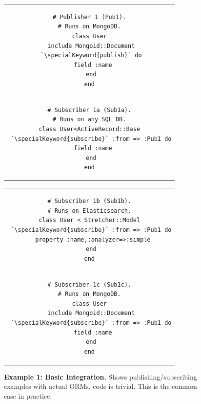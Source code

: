 \begin{figure}[t]
\begin{tabular}{c}
\begin{minipage}{.22\textwidth}
\begin{lstlisting}[xleftmargin=1pt,framexleftmargin=1pt]
# Publisher 1 (Pub1).
# Runs on MongoDB.
class User
 include Mongoid::Document
 `\specialKeyword{publish}` do
  field :name
 end
end
\end{lstlisting}
\end{minipage}\vspace{-8pt}\\
\begin{minipage}{.22\textwidth}
\begin{lstlisting}[xleftmargin=1pt,framexleftmargin=1pt]
# Subscriber 1a (Sub1a).
# Runs on any SQL DB.
class User<ActiveRecord::Base
 `\specialKeyword{subscribe}` :from => :Pub1 do
  field :name
 end
end
\end{lstlisting}
\end{minipage}
\end{tabular}\hfill
\begin{tabular}{c}
\begin{minipage}{0.22\textwidth}
\begin{lstlisting}[xleftmargin=1pt,framexleftmargin=1pt]
# Subscriber 1b (Sub1b).
# Runs on Elasticsearch.
class User < Stretcher::Model
 `\specialKeyword{subscribe}` :from => :Pub1 do
  property :name,:analyzer=>:simple
 end
end
\end{lstlisting}
\end{minipage}\vspace{-8pt}\\
\begin{minipage}{0.22\textwidth}
\begin{lstlisting}[xleftmargin=1pt,framexleftmargin=1pt]
# Subscriber 1c (Sub1c).
# Runs on MongoDB.
class User
 include Mongoid::Document
 `\specialKeyword{subscribe}` :from => :Pub1 do
  field :name
 end
end
\end{lstlisting}
\end{minipage}
\end{tabular}
\vspace{-16pt}
\caption{{\bf Example 1: Basic Integration.}
Shows publishing/subscribing examples with actual ORMs.
\synapse code is trivial.  This is the common case in practice.
}
\label{fig:mongo-to-star}
\end{figure}

